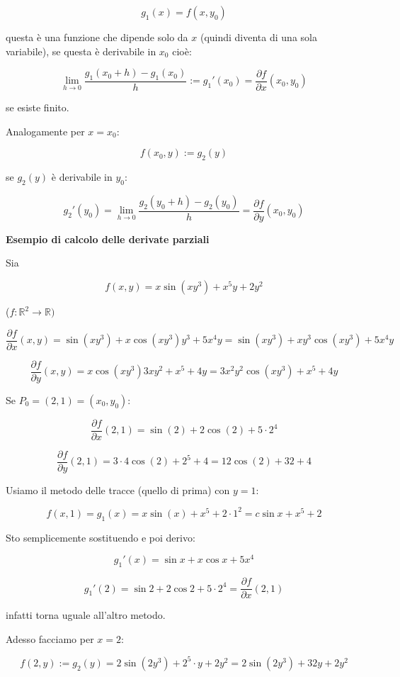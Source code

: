 \documentclass[11pt]{article}
\begin{document}
\[
    g_1(x)= f(x,y_0) 
\]

questa è una funzione che dipende solo da $x$ (quindi diventa di una sola variabile), se questa è derivabile in $x_0$ cioè:

\[
    \lim_{ h \to 0 } \frac{g_1(x_0+h)-g_1(x_0)}{h} := g_1'(x_0) = \frac{\partial f}{\partial x}(x_0,y_0)
\]

se esiste finito.

Analogamente per $x=x_0$:

\[
    f(x_0,y) := g_2(y)
\]

se $g_2(y)$ è derivabile in $y_0$:

\[
    g_2'(y_0)  = \lim_{ h \to 0 } \frac{g_2(y_0+h)-g_2(y_0)}{h} = \frac{\partial f}{\partial y}(x_0,y_0)
\]


\textbf{Esempio di calcolo delle derivate parziali} 

Sia 

\[
f(x,y) = x \sin(xy^{3})+x^{5}y+2y^{2} 
\]

($f: \mathbb{R}^{2}\rightarrow \mathbb{R})$


\[
    \frac{\partial f}{\partial x}(x,y) = \sin(xy^{3}) + x \cos(xy^{3}) y^{3}+5x^{4}y = \sin(xy^{3}) +xy^{3} \cos(xy^{3}) + 5x^{4}y
\]

\[
    \frac{\partial f}{\partial y}(x,y)  = x \cos(xy^{3}) 3xy^{2}+x^{5}+4y = 3 x^{2}y^{2} \cos(xy^{3}) + x^{5}+4y
\]

Se $P_0 = (2,1) = (x_0,y_0)$:

\[
    \frac{\partial f}{\partial x}(2,1) = \sin(2) + 2 \cos(2) + 5\cdot 2^{4} 
\]

\[
    \frac{\partial f}{\partial y}(2,1)  = 3\cdot 4 \cos(2) + 2^{5}+4 = 12 \cos(2) +32 + 4
\]

Usiamo il metodo delle tracce (quello di prima) con $y=1$:

\[
    f(x,1) = g_1(x)  = x \sin(x) + x^{5}+2 \cdot 1^{2} = c \sin x + x^{5}+2
\]

Sto semplicemente sostituendo e poi derivo:

\[
    g_1'(x) = \sin x+ x \cos x + 5x^{4}
\]

\[
    g_1'(2) = \sin 2 + 2 \cos 2 + 5 \cdot 2^{4} = \frac{\partial f}{\partial x}(2,1)
\]

infatti torna uguale all'altro metodo.

Adesso facciamo per $x=2$:

\[
    f(2,y) := g_2(y) = 2 \sin(2y^{3}) + 2^{5} \cdot y + 2y^{2} = 2 \sin(2y^{3}) + 32y + 2y^{2}
\]
\end{document}

